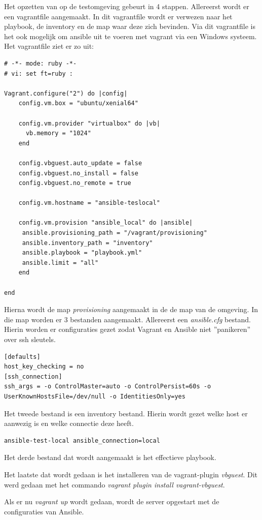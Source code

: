 Het opzetten van op de testomgeving gebeurt in 4 stappen. Allereerst wordt er een vagrantfile aangemaakt. In dit vagrantfile wordt er verwezen naar het playbook, de inventory en de map waar deze zich bevinden. Via dit vagrantfile is het ook mogelijk om ansible uit te voeren met vagrant via een Windows systeem. Het vagrantfile ziet er zo uit:
\begin{lstlisting}
# -*- mode: ruby -*-
# vi: set ft=ruby :

Vagrant.configure("2") do |config|
    config.vm.box = "ubuntu/xenial64"
    
    config.vm.provider "virtualbox" do |vb|
      vb.memory = "1024"
    end
    
    config.vbguest.auto_update = false
    config.vbguest.no_install = false
    config.vbguest.no_remote = true
    
    config.vm.hostname = "ansible-teslocal"
    
    config.vm.provision "ansible_local" do |ansible|
     ansible.provisioning_path = "/vagrant/provisioning"
     ansible.inventory_path = "inventory"
     ansible.playbook = "playbook.yml"
     ansible.limit = "all"
    end

end
\end{lstlisting}

Hierna wordt de map \textit{provisioning} aangemaakt in de de map van de omgeving. In die map worden er 3 bestanden aangemaakt. Allereerst een \textit{ansible.cfg} bestand. Hierin worden er configuraties gezet zodat Vagrant en Ansible niet ''panikeren'' over ssh sleutels.
\begin{lstlisting}
[defaults]
host_key_checking = no
[ssh_connection]
ssh_args = -o ControlMaster=auto -o ControlPersist=60s -o UserKnownHostsFile=/dev/null -o IdentitiesOnly=yes
\end{lstlisting}
Het tweede bestand is een inventory bestand. Hierin wordt gezet welke host er aanwezig is en welke connectie deze heeft.
\begin{lstlisting}
ansible-test-local ansible_connection=local
\end{lstlisting}

Het derde bestand dat wordt aangemaakt is het effectieve playbook.

Het laatste dat wordt gedaan is het installeren van de vagrant-plugin \textit{vbguest}. Dit werd gedaan met het commando \textit{vagrant plugin install vagrant-vbguest}.

Als er nu \textit{vagrant up} wordt gedaan, wordt de server opgestart met de configuraties van Ansible.

